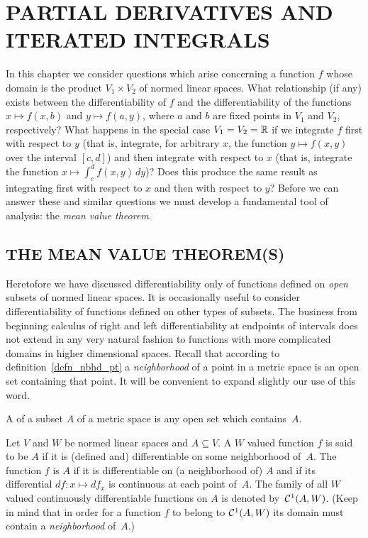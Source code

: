 \chapter{PARTIAL DERIVATIVES AND ITERATED INTEGRALS}

In this chapter we consider questions which arise concerning a function $f$ whose domain is
the product $V_1 \times V_2$ of normed linear spaces.  What relationship (if any) exists
between the differentiability of $f$ and the differentiability of the functions $x \mapsto
f(x,b)$ and $y \mapsto f(a,y)$, where $a$ and $b$ are fixed points in $V_1$ and $V_2$,
respectively? What happens in the special case $V_1 = V_2 = \mathbb{R}$ if we integrate $f$ first with
respect to $y$ (that is, integrate, for arbitrary $x$, the function $y \mapsto f(x,y)$ over
the interval $[c,d]$) and then integrate with respect to $x$ (that is, integrate the function
$x \mapsto \int_c^d f(x,y)\,dy$)?  Does this produce the same result as integrating first with
respect to $x$ and then with respect to $y$?  Before we can answer these and similar questions
we must develop a fundamental tool of analysis: the \emph{mean value theorem}.




\section{THE MEAN VALUE THEOREM(S)}
Heretofore we have discussed differentiability only of functions defined on \emph{open}
subsets of normed linear spaces.  It is occasionally useful to consider differentiability of
functions defined on other types of subsets.  The business from beginning calculus of right
and left differentiability at endpoints of intervals does not extend in any very natural
fashion to functions with more complicated domains in higher dimensional spaces.  Recall that
according to definition~\ref{defn_nbhd_pt} a \emph{neighborhood} of a point in a metric space
is an open set containing that point. It will be convenient to expand slightly our use of this
word.

\begin{defn} A
 of a subset $A$ of a metric space is any open set which contains~$A$.
\end{defn}

\begin{defn} Let $V$ and $W$ be normed linear spaces and $A \subseteq V$.  A $W$ valued function
$f$ is said to be
 $A$ if it is (defined and) differentiable on some neighborhood of~$A$.
The function $f$ is
 $A$ if it is differentiable on (a neighborhood of) $A$ and
if its differential $df\colon x \mapsto df_x$ is continuous at each point of~$A$.  The family
of all $W$ valued continuously differentiable functions on $A$ is denoted
by~$\mathcal{C}^1(A,W)$.  (Keep in mind that in order for a function $f$ to belong to $\mathcal{C}^1(A,W)$ its domain must contain a \emph{neighborhood} of~$A$.)
\end{defn}

